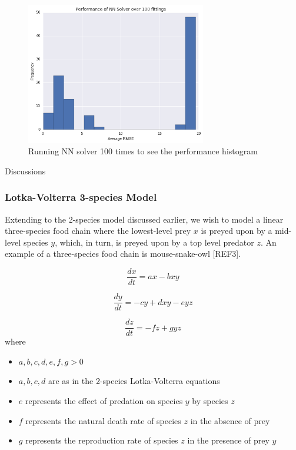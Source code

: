 \documentclass[11pt]{article}
\begin{document}
\begin{figure}
\centering
\includegraphics[width=0.7\textwidth]{perf_distribution.png}
      \caption{Running NN solver 100 times to see the performance histogram \label{fig:perf_dist}}
\end{figure}

Discussions

\subsubsection{Lotka-Volterra 3-species Model}
Extending to the 2-species model discussed earlier, we wish to model a linear three-species food chain where the lowest-level prey $x$ is preyed upon by a mid-level species $y$, which, in turn, is preyed upon by a top level predator $z$. An example of a three-species food chain is mouse-snake-owl [REF3].  

    \begin{equation}
      \frac{dx}{dt} = ax - bxy
      \label{eq:LV3}
    \end{equation}
    
     \begin{equation}
      \frac{dy}{dt} = - cy + dxy - eyz
      \label{eq:LV4}
    \end{equation}
    
     \begin{equation}
      \frac{dz}{dt} = - fz + gyz
      \label{eq:LV5}
    \end{equation}
where
\begin{itemize}
\item $a, b, c, d, e, f, g >0$ 
\item $a, b, c, d$ are as in the 2-species Lotka-Volterra equations
\item $e$ represents the effect of predation on species $y$ by species $z$
\item $f$ represents the natural death rate of species $z$ in the absence of prey
\item $g$ represents the reproduction rate of species $z$ in the presence of prey $y$
\end{itemize}
\end{document}
